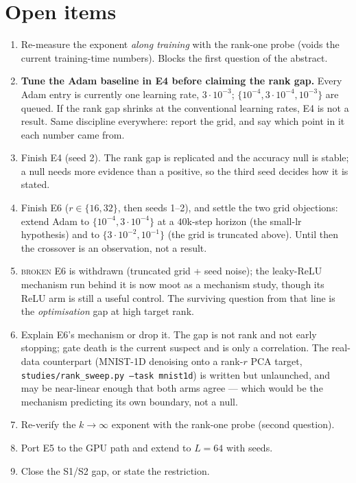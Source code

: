 \documentclass{article}
\newcommand{\NO}{{\color{red!75!black}\textsc{broken}}}
\theoremstyle{plain}\newtheorem{theorem}{Theorem}\newtheorem{lemma}[theorem]{Lemma}
\theoremstyle{definition}\newtheorem{definition}[theorem]{Definition}
\begin{document}
\section{Open items}\label{sec:open}
\begin{enumerate}[leftmargin=*,itemsep=0pt]
  \item Re-measure the exponent \emph{along training} with the rank-one probe (voids the current
        training-time numbers). Blocks the first question of the abstract.
  \item \textbf{Tune the Adam baseline in E4 before claiming the rank gap.} Every Adam entry is
        currently one learning rate, $3\cdot10^{-3}$; $\{10^{-4},3\cdot10^{-4},10^{-3}\}$ are
        queued. If the rank gap shrinks at the conventional learning rates, E4 is not a result.
        Same discipline everywhere: report the grid, and say which point in it each number came
        from.
  \item Finish E4 (seed 2). The rank gap is replicated and the accuracy null is stable; a null
        needs more evidence than a positive, so the third seed decides how it is stated.
  \item Finish E6 ($r\in\{16,32\}$, then seeds 1--2), and settle the two grid objections: extend
        Adam to $\{10^{-4},3\cdot10^{-4}\}$ at a $40$k-step horizon (the small-lr hypothesis) and
        to $\{3\cdot10^{-2},10^{-1}\}$ (the grid is truncated above). Until then the crossover is
        an observation, not a result.
  \item \NO{} E6 is withdrawn (truncated grid + seed noise); the leaky-ReLU mechanism run behind it
        is now moot as a mechanism study, though its ReLU arm is still a useful control. The
        surviving question from that line is the \emph{optimisation} gap at high target rank.
  \item [superseded] Explain E6's mechanism or drop it. The gap is not rank and not early stopping; gate death
        is the current suspect and is only a correlation. The real-data counterpart (MNIST-1D
        denoising onto a rank-$r$ PCA target, \texttt{studies/rank\_sweep.py --task mnist1d}) is
        written but unlaunched, and may be near-linear enough that both arms agree --- which would
        be the mechanism predicting its own boundary, not a null.
  \item Re-verify the $k\to\infty$ exponent with the rank-one probe (second question).
  \item Port E5 to the GPU path and extend to $L=64$ with seeds.
  \item Close the S1/S2 gap, or state the restriction.
\end{enumerate}
\end{document}
